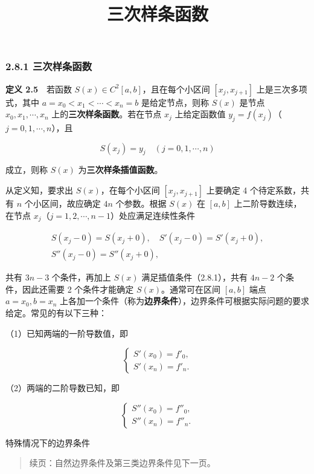 \documentclass[
  10pt,
  fontset=fandol]{ctexart}
\title{三次样条函数}
\author{}
\date{}
\begin{document}
\maketitle

\subsubsection{2.8.1 三次样条函数}\label{ux4e09ux6b21ux6837ux6761ux51fdux6570}

\textbf{定义 2.5}　若函数 \(S(x)\in C^2[a,b]\)，且在每个小区间 \([x_j,x_{j+1}]\) 上是三次多项式，其中 \(a=x_0<x_1<\cdots<x_n=b\) 是给定节点，则称 \(S(x)\) 是节点 \(x_0,x_1,\cdots,x_n\) 上的\textbf{三次样条函数}。若在节点 \(x_j\) 上给定函数值 \(y_j=f(x_j)\)（\(j=0,1,\cdots,n\)），且

\[S(x_j)=y_j\quad(j=0,1,\cdots,n)\tag{2.8.1}\]

成立，则称 \(S(x)\) 为\textbf{三次样条插值函数}。

从定义知，要求出 \(S(x)\)，在每个小区间 \([x_j,x_{j+1}]\) 上要确定 4 个待定系数，共有 \(n\) 个小区间，故应确定 \(4n\) 个参数。根据 \(S(x)\) 在 \([a,b]\) 上二阶导数连续，在节点 \(x_j\)（\(j=1,2,\cdots,n-1\)）处应满足连续性条件

\[\begin{gathered}
S(x_j-0)=S(x_j+0),\quad S'(x_j-0)=S'(x_j+0),\\
S''(x_j-0)=S''(x_j+0),
\end{gathered}\tag{2.8.2}\]

共有 \(3n-3\) 个条件，再加上 \(S(x)\) 满足插值条件（2.8.1），共有 \(4n-2\) 个条件，因此还需要 2 个条件才能确定 \(S(x)\)。通常可在区间 \([a,b]\) 端点 \(a=x_0,b=x_n\) 上各加一个条件（称为\textbf{边界条件}），边界条件可根据实际问题的要求给定。常见的有以下三种：

（1）已知两端的一阶导数值，即

\[\begin{cases}S'(x_0)=f'_0,\\S'(x_n)=f'_n.\end{cases}\tag{2.8.3}\]

（2）两端的二阶导数已知，即

\[\begin{cases}S''(x_0)=f''_0,\\S''(x_n)=f''_n.\end{cases}\tag{2.8.4}\]

特殊情况下的边界条件

\begin{quote}
续页：自然边界条件及第三类边界条件见下一页。
\end{quote}
\end{document}
